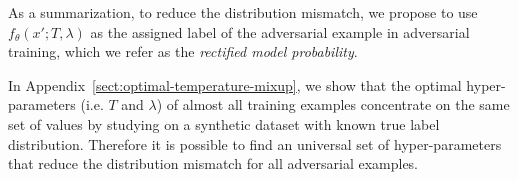     
    As a summarization, 
    to reduce the distribution mismatch, we propose to use 
    $f_\theta(x'; T, \lambda)$
    as the assigned label of the adversarial example in adversarial training, which we refer as the \emph{rectified model probability}.
    
    In Appendix~\ref{sect:optimal-temperature-mixup}, we show that the optimal hyper-parameters (i.e. $T$ and $\lambda$) of almost all training examples concentrate on the same set of values by studying on a synthetic dataset with known true label distribution. 
    Therefore it is possible to find an universal set of hyper-parameters that reduce the distribution mismatch for all adversarial examples. 


